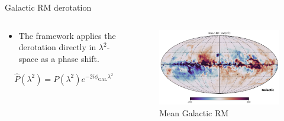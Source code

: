\documentclass[xetex,aspectratio=169]{beamer}
\begin{document}
\begin{frame}{Galactic RM derotation}
	\begin{columns}[onlytextwidth,t]
		\begin{column}{.5\textwidth}
			\begin{itemize}
				\item The framework applies the derotation directly in $\lambda^2$-space as a phase shift.
			\end{itemize}
			\vspace{1cm}
			\begin{equation*}
				\hat{P}(\lambda^2) = P(\lambda^2)e^{-2i\phi_{\text{GAL}}\lambda^2}
			\end{equation*}
		\end{column}

		\begin{column}{.5\textwidth}
			\begin{figure}
				\centering
				\includegraphics[width=\textwidth]{figures/galactic_derotation/image (2).png}
				\caption*{Mean Galactic RM ~\parencite{faradaysky2020}}
			\end{figure}
		\end{column}
	\end{columns}
\end{frame}
\end{document}
